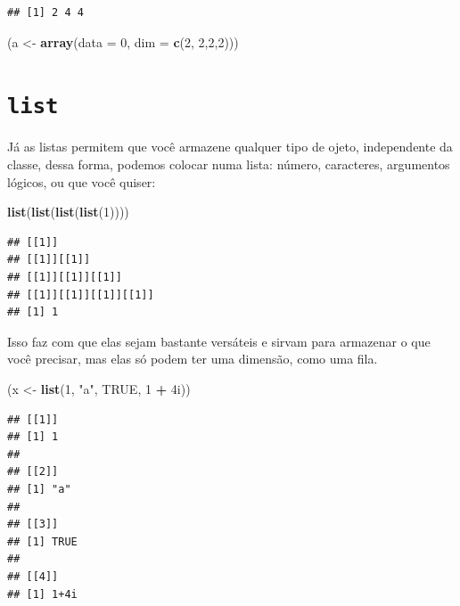 \documentclass[]{book}
\newenvironment{Shaded}{\begin{snugshade}}{\end{snugshade}}
\newcommand{\KeywordTok}[1]{\textcolor[rgb]{0.13,0.29,0.53}{\textbf{#1}}}
\newcommand{\DataTypeTok}[1]{\textcolor[rgb]{0.13,0.29,0.53}{#1}}
\newcommand{\DecValTok}[1]{\textcolor[rgb]{0.00,0.00,0.81}{#1}}
\newcommand{\StringTok}[1]{\textcolor[rgb]{0.31,0.60,0.02}{#1}}
\newcommand{\OtherTok}[1]{\textcolor[rgb]{0.56,0.35,0.01}{#1}}
\newcommand{\OperatorTok}[1]{\textcolor[rgb]{0.81,0.36,0.00}{\textbf{#1}}}
\newcommand{\NormalTok}[1]{#1}
\begin{document}
\begin{verbatim}
## [1] 2 4 4
\end{verbatim}

\begin{Shaded}
\begin{Highlighting}[]
\NormalTok{(a <-}\StringTok{ }\KeywordTok{array}\NormalTok{(}\DataTypeTok{data =} \DecValTok{0}\NormalTok{, }\DataTypeTok{dim =} \KeywordTok{c}\NormalTok{(}\DecValTok{2}\NormalTok{, }\DecValTok{2}\NormalTok{,}\DecValTok{2}\NormalTok{,}\DecValTok{2}\NormalTok{)))}
\end{Highlighting}
\end{Shaded}

\section{\texorpdfstring{\texttt{list}}{list}}\label{list}

Já as listas permitem que você armazene qualquer tipo de ojeto,
independente da classe, dessa forma, podemos colocar numa lista: número,
caracteres, argumentos lógicos, ou que você quiser:

\begin{Shaded}
\begin{Highlighting}[]
\KeywordTok{list}\NormalTok{(}\KeywordTok{list}\NormalTok{(}\KeywordTok{list}\NormalTok{(}\KeywordTok{list}\NormalTok{(}\DecValTok{1}\NormalTok{))))}
\end{Highlighting}
\end{Shaded}

\begin{verbatim}
## [[1]]
## [[1]][[1]]
## [[1]][[1]][[1]]
## [[1]][[1]][[1]][[1]]
## [1] 1
\end{verbatim}

Isso faz com que elas sejam bastante versáteis e sirvam para armazenar o
que você precisar, mas elas só podem ter uma dimensão, como uma fila.

\begin{Shaded}
\begin{Highlighting}[]
\NormalTok{(x <-}\StringTok{ }\KeywordTok{list}\NormalTok{(}\DecValTok{1}\NormalTok{, }\StringTok{"a"}\NormalTok{, }\OtherTok{TRUE}\NormalTok{, }\DecValTok{1} \OperatorTok{+}\StringTok{ }\NormalTok{4i))}
\end{Highlighting}
\end{Shaded}

\begin{verbatim}
## [[1]]
## [1] 1
## 
## [[2]]
## [1] "a"
## 
## [[3]]
## [1] TRUE
## 
## [[4]]
## [1] 1+4i
\end{verbatim}
\end{document}

